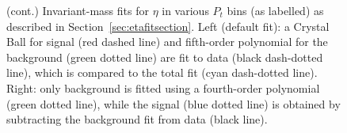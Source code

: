 \begin{figure}[H]
\caption[Invariant-mass fits for $\eta$ in various $P_{t}$ bins (cont.)]{(cont.) Invariant-mass fits for $\eta$ in various $P_{t}$ bins (as labelled) as described in Section~\ref{sec:etafitsection}. Left (default fit):  a Crystal Ball for signal (red dashed line) and fifth-order polynomial for the background (green dotted line) are fit to data (black dash-dotted line), which is compared to the total fit  (cyan dash-dotted line). Right: only background is fitted using a fourth-order polynomial (green dotted line), while the signal (blue dotted line) is obtained by subtracting the background fit from data (black line).}
  \label{fig:etaptfit}
\end{figure}
